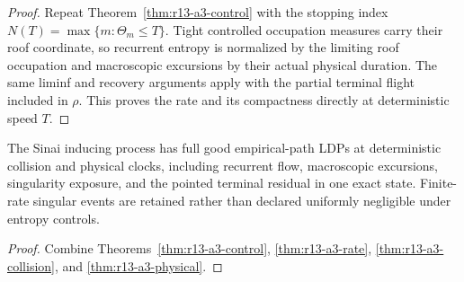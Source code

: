 \begin{proof}
Repeat Theorem~\ref{thm:r13-a3-control} with the stopping index
$N(T)=\max\{m:\Theta_m\le T\}$.  Tight controlled occupation measures carry
their roof coordinate, so recurrent entropy is normalized by the limiting
roof occupation and macroscopic excursions by their actual physical
duration.  The same liminf and recovery arguments apply with the partial
terminal flight included in $\rho$.  This proves the rate and its compactness
directly at deterministic speed $T$.
\end{proof}

\begin{theorem}
\label{thm:r13-a3-main}
The Sinai inducing process has full good empirical-path LDPs at deterministic
collision and physical clocks, including recurrent flow, macroscopic
excursions, singularity exposure, and the pointed terminal residual in one
exact state.  Finite-rate singular events are retained rather than declared
uniformly negligible under entropy controls.
\end{theorem}

\begin{proof}
Combine Theorems~\ref{thm:r13-a3-control},
\ref{thm:r13-a3-rate}, \ref{thm:r13-a3-collision}, and
\ref{thm:r13-a3-physical}.
\end{proof}
